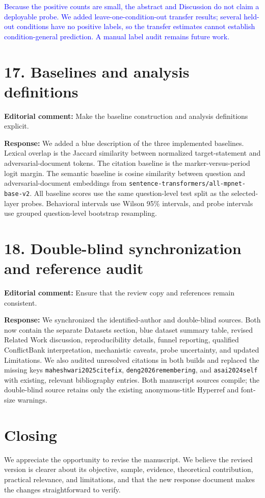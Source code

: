 \documentclass[11pt]{article}
\begin{document}
\textcolor{blue}{Because the positive counts are small, the abstract and Discussion do not claim a deployable probe. We added leave-one-condition-out transfer results; several held-out conditions have no positive labels, so the transfer estimates cannot establish condition-general prediction. A manual label audit remains future work.}

\section*{17. Baselines and analysis definitions}

\textbf{Editorial comment:} Make the baseline construction and analysis definitions explicit.

\textbf{Response:} We added a blue description of the three implemented baselines. Lexical overlap is the Jaccard similarity between normalized target-statement and adversarial-document tokens. The citation baseline is the marker-versus-period logit margin. The semantic baseline is cosine similarity between question and adversarial-document embeddings from \texttt{sentence-transformers/all-mpnet-base-v2}. All baseline scores use the same question-level test split as the selected-layer probes. Behavioral intervals use Wilson 95\% intervals, and probe intervals use grouped question-level bootstrap resampling.

\section*{18. Double-blind synchronization and reference audit}

\textbf{Editorial comment:} Ensure that the review copy and references remain consistent.

\textbf{Response:} We synchronized the identified-author and double-blind sources. Both now contain the separate Datasets section, blue dataset summary table, revised Related Work discussion, reproducibility details, funnel reporting, qualified ConflictBank interpretation, mechanistic caveats, probe uncertainty, and updated Limitations. We also audited unresolved citations in both builds and replaced the missing keys \texttt{maheshwari2025citefix}, \texttt{deng2026remembering}, and \texttt{asai2024self} with existing, relevant bibliography entries. Both manuscript sources compile; the double-blind source retains only the existing anonymous-title Hyperref and font-size warnings.

\section*{Closing}

We appreciate the opportunity to revise the manuscript. We believe the revised version is clearer about its objective, sample, evidence, theoretical contribution, practical relevance, and limitations, and that the new response document makes the changes straightforward to verify.
\end{document}
